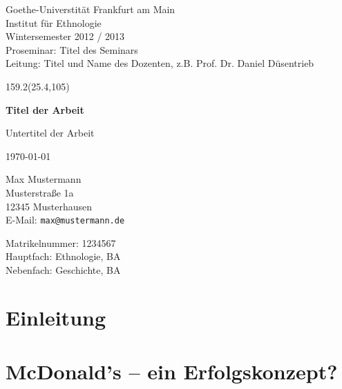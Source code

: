 \documentclass[12pt,titlepage]{scrartcl}
\begin{document}
\begin{titlepage}
\singlespacing
\noindent
Goethe-Universtität Frankfurt am Main\\
Institut für Ethnologie\\
Wintersemester 2012 / 2013\\
Proseminar: Titel des Seminars\\
Leitung: Titel und Name des Dozenten, z.B. Prof. Dr. Daniel Düsentrieb

\vfill

\begin{textblock}{159.2}(25.4,105)
\begin{center}
    \Huge{\textbf{Titel der Arbeit}}

    \vspace{1em}

    \large{Untertitel der Arbeit}

    \vspace{5em}

    \large{\today}
\end{center}
\end{textblock}

\vfill

\noindent
\begin{minipage}[t]{0.5\linewidth}
Max Mustermann\\
Musterstraße 1a\\
12345 Musterhausen\\

E-Mail: \texttt{max@mustermann.de}
\end{minipage}
\hfill
\begin{minipage}[t]{0.35\linewidth}
Matrikelnummer: 1234567\\
Hauptfach: Ethnologie, BA\\
Nebenfach: Geschichte, BA
\end{minipage}
\onehalfspacing
\end{titlepage}
\restoregeometry


\newpage
{}
\tableofcontents
{}
\newpage

\section{Einleitung} %
\label{sec:einleitung}

\lipsum


\section{McDonald's -- ein Erfolgskonzept?} %
\label{sec:mcdonald_s_ein_erfolgskonzept_}
\end{document}
